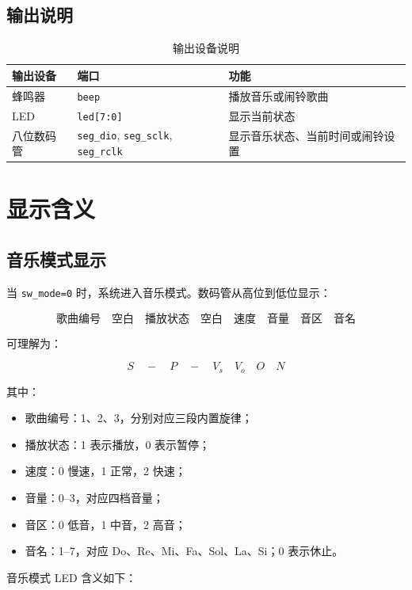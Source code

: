 \documentclass[UTF8,a4paper,12pt]{ctexart}
\newcommand{\port}[1]{\texttt{#1}}
\begin{document}
\subsection{输出说明}

\begin{table}[H]
  \centering
  \caption{输出设备说明}
  \begin{tabular}{lll}
    \toprule
    输出设备 & 端口 & 功能 \\
    \midrule
    蜂鸣器 & \port{beep} & 播放音乐或闹铃歌曲 \\
    LED & \port{led[7:0]} & 显示当前状态 \\
    八位数码管 & \port{seg\_dio}, \port{seg\_sclk}, \port{seg\_rclk} & 显示音乐状态、当前时间或闹铃设置 \\
    \bottomrule
  \end{tabular}
\end{table}

\section{显示含义}

\subsection{音乐模式显示}

当 \port{sw\_mode=0} 时，系统进入音乐模式。数码管从高位到低位显示：

\[
\text{歌曲编号}\quad \text{空白}\quad \text{播放状态}\quad \text{空白}\quad \text{速度}\quad \text{音量}\quad \text{音区}\quad \text{音名}
\]

可理解为：

\[
S\quad -\quad P\quad -\quad V_s\quad V_o\quad O\quad N
\]

其中：

\begin{itemize}
  \item 歌曲编号：1、2、3，分别对应三段内置旋律；
  \item 播放状态：1 表示播放，0 表示暂停；
  \item 速度：0 慢速，1 正常，2 快速；
  \item 音量：0--3，对应四档音量；
  \item 音区：0 低音，1 中音，2 高音；
  \item 音名：1--7，对应 Do、Re、Mi、Fa、Sol、La、Si；0 表示休止。
\end{itemize}

音乐模式 LED 含义如下：
\end{document}
